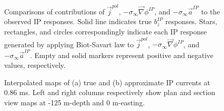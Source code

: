 \documentclass[extra,mreferee]{gji}
\newcommand{\grad}{\vec \nabla}
\newcommand{\siginf}{\sigma_\infty}
\renewcommand {\j}  { {\vec j} }
\begin{document}
\begin{figure}
  \caption{Comparisons of contributions of $\j^{pol}$, $-\siginf\grad \phi^{IP}$, and $-\siginf\vec{a}^{IP}$ to the observed IP responses. Solid line indicates true $b_z^{IP}$ responses. Stars, rectangles, and circles correspondingly indicate each IP response generated by applying Biot-Savart law to $\j^{pol}$, $-\siginf\grad \phi^{IP}$, and $-\siginf\vec{a}^{IP}$. Empty and solid markers represent positive and negative values, respectively.}
  \label{F:DecompjIPcond}
\end{figure}

\begin{figure}
  \caption{Interpolated maps of (a) true and (b) approximate IP currents at 0.86 ms. Left and right columns respectively show plan and section view maps at -125 m-depth and 0 m-easting. }
  \label{F:IPcurrent_PlanandSec_early}
\end{figure}
\end{document}
